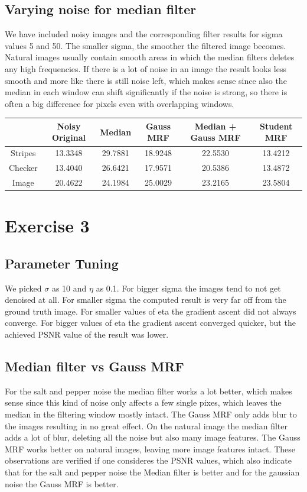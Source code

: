 \documentclass[a4paper,11pt, final]{scrartcl}
\begin{document}
\subsection*{Varying noise for median filter}
We have included noisy images and the corresponding filter results for sigma values 5 and 50. The smaller sigma, the smoother the filtered image becomes. Natural images usually contain smooth areas in which the median filters deletes any high frequencies. If there is a lot of noise in an image the result looks less smooth and more like there is still noise left, which makes sense since also the median in each window can shift significantly if the noise is strong, so there is often a big difference for pixels even with overlapping windows.

\vspace{1cm}
{
\centering 
\begin{tabular}{|c|c|c|c|c|c|} \hline
  & Noisy Original & Median & Gauss MRF & Median + Gauss MRF & Student MRF \\ \hline
 Stripes & 13.3348 & 29.7881 & 18.9248 & 22.5530 & 13.4212 \\ \hline
 Checker & 13.4040 & 26.6421 & 17.9571 & 20.5386 & 13.4872 \\ \hline
 Image & 20.4622 & 24.1984 & 25.0029 & 23.2165 & 23.5804 \\ \hline
\end{tabular}
}  

\section*{Exercise 3}

\subsection*{Parameter Tuning}
We picked $\sigma$ as 10 and $\eta$ as 0.1. For bigger sigma the images tend to not get denoised at all. For smaller sigma the computed result is very far off from the ground truth image. For smaller values of eta the gradient ascent did not always converge. For bigger values of eta the gradient ascent converged quicker, but the achieved PSNR value of the result was lower.

\subsection*{Median filter vs Gauss MRF}
For the salt and pepper noise the median filter works a lot better, which makes sense since this kind of noise only affects a few single pixes, which leaves the median in the filtering window mostly intact. The Gauss MRF only adds blur to the images resulting in no great effect. On the natural image the median filter adds a lot of blur, deleting all the noise but also many image features. The Gauss MRF works better on natural images, leaving more image features intact. These observations are verified if one consideres the PSNR values, which also indicate that for the salt and pepper noise the Median filter is better and for the gaussian noise the Gauss MRF is better.
\end{document}
